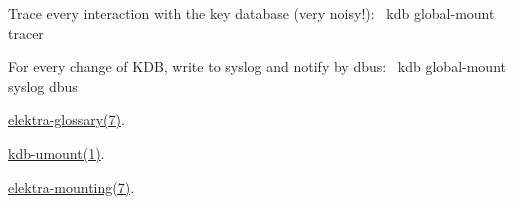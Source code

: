Trace every interaction with the key database (very noisy!)\+:~\newline
 {\ttfamily kdb global-\/mount tracer}

For every change of K\+DB, write to syslog and notify by dbus\+:~\newline
 {\ttfamily kdb global-\/mount syslog dbus}


\begin{DoxyItemize}
\item \hyperlink{doc_help_elektra-glossary_md}{elektra-\/glossary(7)}.
\item \hyperlink{doc_help_kdb-umount_md}{kdb-\/umount(1)}.
\item \hyperlink{doc_help_elektra-mounting_md}{elektra-\/mounting(7)}. 
\end{DoxyItemize}